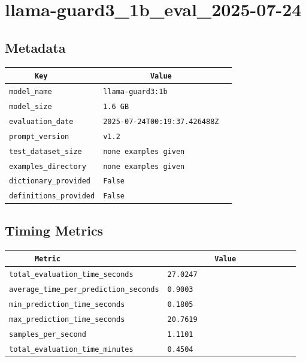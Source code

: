 \documentclass{article}
\begin{document}
\section{llama-guard3\_1b\_eval\_2025-07-24}
\subsection{Metadata}

\begin{center}
\begin{tabular}{l | l} \hline
    \verb|      Key      | & \verb|           Value           | \\ \hline
    \hline
    \verb|model_name    | & \verb|llama-guard3:1b              | \\ \hline
    \verb|model_size    | & \verb|1.6 GB                       | \\ \hline
    \verb|evaluation_date| & \verb|2025-07-24T00:19:37.426488Z  | \\ \hline
    \verb|prompt_version| & \verb|v1.2                         | \\ \hline
    \verb|test_dataset_size| & \verb|none examples given          | \\ \hline
    \verb|examples_directory| & \verb|none examples given          | \\ \hline
    \verb|dictionary_provided| & \verb|False                        | \\ \hline
    \verb|definitions_provided| & \verb|False                        | \\ \hline
\end{tabular}
\end{center}

\subsection{Timing Metrics}

\begin{center}
\begin{tabular}{l | l} \hline
    \verb|      Metric     | & \verb|           Value           | \\ \hline
    \hline
    \verb|total_evaluation_time_seconds| & \verb|27.0247                      | \\ \hline
    \verb|average_time_per_prediction_seconds| & \verb|0.9003                       | \\ \hline
    \verb|min_prediction_time_seconds| & \verb|0.1805                       | \\ \hline
    \verb|max_prediction_time_seconds| & \verb|20.7619                      | \\ \hline
    \verb|samples_per_second| & \verb|1.1101                       | \\ \hline
    \verb|total_evaluation_time_minutes| & \verb|0.4504                       | \\ \hline
\end{tabular}
\end{center}
\end{document}
